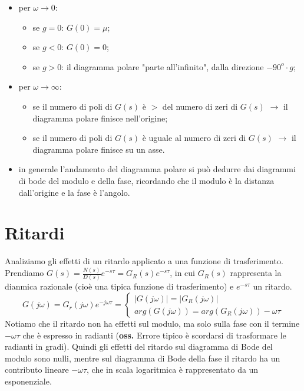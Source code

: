     \begin{itemize}
        \item per $\omega \rightarrow  0$:
        \begin{itemize}
            \item se $g=0$: $G(0) = \mu$;
            \item se $g<0$: $G(0) = 0$;
            \item se $g>0$: il diagramma polare "parte all'infinito", dalla direzione $-90^o \cdot  g$;
        \end{itemize}
        \item per $\omega \rightarrow  \infty$:
        \begin{itemize}
            \item se il numero di poli di $G(s)$ è $>$ del numero di zeri di $G(s)$ $\rightarrow $ il diagramma polare finisce nell'origine;
            \item se il numero di poli di $G(s)$ è uguale al numero di zeri di $G(s)$ $\rightarrow $ il diagramma polare finisce su un asse.
        \end{itemize}
        \item in generale l'andamento del diagramma polare si può dedurre dai diagrammi di bode del modulo e della fase, ricordando che il modulo è la distanza dall'origine e la fase è l'angolo.
    \end{itemize}
    \newpage\section{Ritardi}
    Analiziamo gli effetti di un ritardo applicato a una funzione di trasferimento. Prendiamo $G(s) = \frac{N(s)}{D(s)} e^{-s \tau} = G_R(s) e^{-s \tau}$, in cui $G_R(s)$ rappresenta la dianmica razionale (cioè una tipica funzione di trasferimento) e $e^{-s \tau}$ un ritardo.
        \[
            G(j \omega) = G_r(j \omega) e^{- j \omega \tau} = \begin{cases}
                |G(j \omega)| = |G_R(j \omega)|\\
                arg(G(j \omega)) = arg(G_R(j \omega)) - \omega \tau
            \end{cases}
        \]
        Notiamo che il ritardo non ha effetti sul modulo, ma solo sulla fase con il termine $- \omega \tau$ che è espresso in radianti (\textbf{oss.} Errore tipico è scordarsi di trasformare le radianti in gradi).\newline
        Quindi gli effetti del ritardo sul diagramma di Bode del modulo sono nulli, mentre sul diagramma di Bode della fase il ritardo ha un contributo lineare $- \omega \tau$, che in scala logaritmica è rappresentato da un esponenziale.\newline
